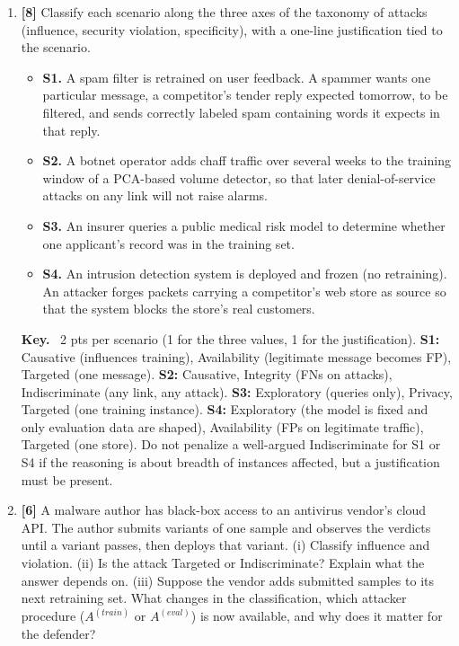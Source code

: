 \documentclass[10pt,a4paper]{extarticle}
\newcommand{\pts}[1]{\textbf{\color{accent}[#1]}\enspace}
\newenvironment{sol}{\par\smallskip
    \begin{tcolorbox}[colback=accent!6, colframe=accent, boxrule=0.5pt, arc=1pt,
                      left=5pt, right=5pt, top=2pt, bottom=2pt, breakable, fontupper=\small]
    \textbf{\color{accent}Key.}\ }{\end{tcolorbox}\par}
\begin{document}
\begin{enumerate}[label=(\alph*)]
\item \pts{8} Classify each scenario along the three axes of the taxonomy of attacks (influence, security violation, specificity), with a one-line justification tied to the scenario.
\begin{itemize}[leftmargin=1.2cm, label={}]
\item \textbf{S1.} A spam filter is retrained on user feedback. A spammer wants one particular message, a competitor's tender reply expected tomorrow, to be filtered, and sends correctly labeled spam containing words it expects in that reply.
\item \textbf{S2.} A botnet operator adds chaff traffic over several weeks to the training window of a PCA-based volume detector, so that later denial-of-service attacks on any link will not raise alarms.
\item \textbf{S3.} An insurer queries a public medical risk model to determine whether one applicant's record was in the training set.
\item \textbf{S4.} An intrusion detection system is deployed and frozen (no retraining). An attacker forges packets carrying a competitor's web store as source so that the system blocks the store's real customers.
\end{itemize}

\begin{sol}
2 pts per scenario (1 for the three values, 1 for the justification). \textbf{S1:} Causative (influences training), Availability (legitimate message becomes FP), Targeted (one message). \textbf{S2:} Causative, Integrity (FNs on attacks), Indiscriminate (any link, any attack). \textbf{S3:} Exploratory (queries only), Privacy, Targeted (one training instance). \textbf{S4:} Exploratory (the model is fixed and only evaluation data are shaped), Availability (FPs on legitimate traffic), Targeted (one store). Do not penalize a well-argued Indiscriminate for S1 or S4 if the reasoning is about breadth of instances affected, but a justification must be present.
\end{sol}

\item \pts{6} A malware author has black-box access to an antivirus vendor's cloud API. The author submits variants of one sample and observes the verdicts until a variant passes, then deploys that variant. (i) Classify influence and violation. (ii) Is the attack Targeted or Indiscriminate? Explain what the answer depends on. (iii) Suppose the vendor adds submitted samples to its next retraining set. What changes in the classification, which attacker procedure (\(A^{(train)}\) or \(A^{(eval)}\)) is now available, and why does it matter for the defender?


\end{enumerate}
\end{document}
